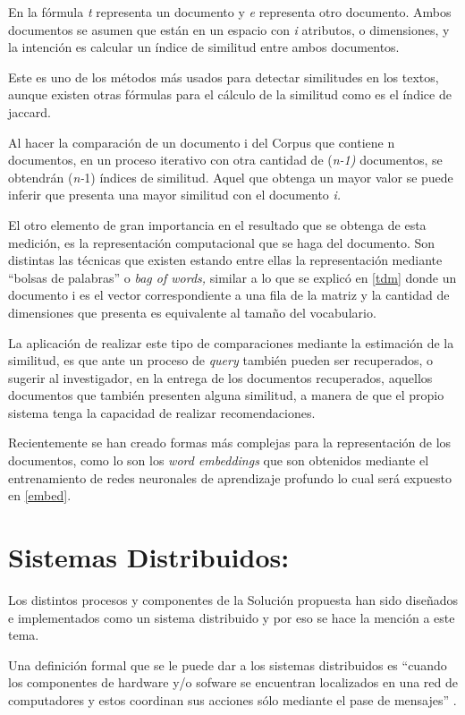 \documentclass[
  10,
  openany]{book}
\begin{document}
En la fórmula \emph{t} representa un documento y \emph{e} representa otro documento. Ambos documentos se asumen que están en un espacio con \emph{i} atributos, o dimensiones, y la intención es calcular un índice de similitud entre ambos documentos.

Este es uno de los métodos más usados para detectar similitudes en los textos, aunque existen otras fórmulas para el cálculo de la similitud como es el índice de jaccard.

Al hacer la comparación de un documento i del Corpus que contiene n documentos, en un proceso iterativo con otra cantidad de (\emph{n-1)} documentos, se obtendrán (\emph{n-}1) índices de similitud. Aquel que obtenga un mayor valor se puede inferir que presenta una mayor similitud con el documento \emph{i.}

El otro elemento de gran importancia en el resultado que se obtenga de esta medición, es la representación computacional que se haga del documento. Son distintas las técnicas que existen estando entre ellas la representación mediante ``bolsas de palabras'' o \emph{bag of words,} similar a lo que se explicó en \ref{tdm} donde un documento i es el vector correspondiente a una fila de la matriz y la cantidad de dimensiones que presenta es equivalente al tamaño del vocabulario.

La aplicación de realizar este tipo de comparaciones mediante la estimación de la similitud, es que ante un proceso de \emph{query} también pueden ser recuperados, o sugerir al investigador, en la entrega de los documentos recuperados, aquellos documentos que también presenten alguna similitud, a manera de que el propio sistema tenga la capacidad de realizar recomendaciones.

Recientemente se han creado formas más complejas para la representación de los documentos, como lo son los \emph{word embeddings} que son obtenidos mediante el entrenamiento de redes neuronales de aprendizaje profundo lo cual será expuesto en \ref{embed}.

\hypertarget{SD}{%
\section{Sistemas Distribuidos:}\label{SD}}

Los distintos procesos y componentes de la Solución propuesta han sido diseñados e implementados como un sistema distribuido y por eso se hace la mención a este tema.

Una definición formal que se le puede dar a los sistemas distribuidos es ``cuando los componentes de hardware y/o sofware se encuentran localizados en una red de computadores y estos coordinan sus acciones sólo mediante el pase de mensajes'' \citep{distribu2012}.
\end{document}
